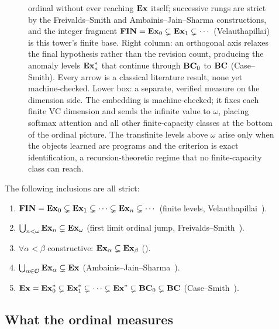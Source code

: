 \begin{figure}[htbp]
{ordinal without ever reaching $\mathbf{Ex}$ itself; successive rungs are strict by the
Freivalds--Smith and Ambainis--Jain--Sharma constructions, and the integer fragment
$\mathbf{FIN} = \mathbf{Ex}_0 \subsetneq \mathbf{Ex}_1 \subsetneq \cdots$ (Velauthapillai) is this tower's
finite base.  Right column: an orthogonal axis relaxes the final hypothesis rather than
the revision count, producing the anomaly levels $\mathbf{Ex}_a^*$ that continue through $\mathbf{BC}_0$
to $\mathbf{BC}$ (Case--Smith).  Every arrow is a classical literature result, none yet
machine-checked.  Lower box: a separate, verified measure on the dimension side.  The
embedding  is machine-checked; it fixes each finite VC
dimension and sends the infinite value to $\omega$, placing softmax attention and all
other finite-capacity classes at the bottom of the ordinal picture.  The transfinite
levels above $\omega$ arise only when the objects learned are programs and the criterion
is exact identification, a recursion-theoretic regime that no finite-capacity class
can reach.}
\label{fig:ordinal-hierarchy}
\end{figure}

\begin{thm}
\label{thm:summary}
The following inclusions are all strict:
\begin{enumerate}[label=(\roman*)]
\item $\mathbf{FIN} = \mathbf{Ex}_0 \subsetneq \mathbf{Ex}_1 \subsetneq \cdots \subsetneq
  \mathbf{Ex}_n \subsetneq \cdots$ \quad (finite levels,
  Velauthapillai~\cite{Velauthapillai1989}).
\item $\bigcup_{n < \omega} \mathbf{Ex}_n \subsetneq \mathbf{Ex}_\omega$ \quad
  (first limit ordinal jump, Freivalds--Smith~\cite{FreivaldsSmith1993}).
\item $\forall \alpha < \beta$ constructive:
  $\mathbf{Ex}_\alpha \subsetneq \mathbf{Ex}_\beta$ \quad
  ().
\item $\bigcup_{\alpha \in \mathcal{O}} \mathbf{Ex}_\alpha \subsetneq \mathbf{Ex}$
  \quad (Ambainis--Jain--Sharma~\cite{AmbainisJainSharma1999}).
\item $\mathbf{Ex} = \mathbf{Ex}_0^* \subsetneq \mathbf{Ex}_1^* \subsetneq \cdots \subsetneq
  \mathbf{Ex}^* \subsetneq \mathbf{BC}_0 \subsetneq \mathbf{BC}$ \quad
  (Case--Smith~\cite{CaseSmith1983}).
\end{enumerate}
\end{thm}


\subsection*{What the ordinal measures}

